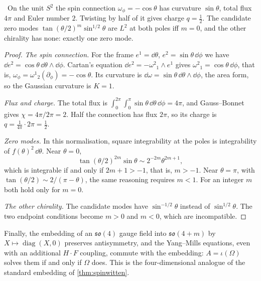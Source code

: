 \begin{proposition}\label{prop:twist}\ver\
On the unit $S^2$ the spin connection $\omega_\phi=-\cos\theta$ has curvature $\sin\theta$, total flux $4\pi$ and Euler number $2$. Twisting by half of it gives charge $q=\frac12$. The candidate zero modes $\tan(\theta/2)^m\sin^{1/2}\theta$ are $L^2$ at both poles iff $m=0$, and the other chirality has none: exactly one zero mode.
\end{proposition}
\begin{proof}
\emph{The spin connection.} For the frame $e^1=\dd\theta$, $e^2=\sin\theta\,\dd\phi$ we have $\dd e^2=\cos\theta\,\dd\theta\wedge\dd\phi$. Cartan's equation $\dd e^2=-\omega^2{}_1\wedge e^1$ gives $\omega^2{}_1=\cos\theta\,\dd\phi$, that is, $\omega_\phi=\omega^1{}_2(\partial_\phi)=-\cos\theta$. Its curvature is $\dd\omega=\sin\theta\,\dd\theta\wedge\dd\phi$, the area form, so the Gaussian curvature is $K=1$.

\emph{Flux and charge.} The total flux is $\int_0^{2\pi}\!\int_0^\pi\sin\theta\,\dd\theta\,\dd\phi=4\pi$, and Gauss--Bonnet gives $\chi=4\pi/2\pi=2$. Half the connection has flux $2\pi$, so its charge is $q=\frac1{4\pi}\cdot2\pi=\frac12$.

\emph{Zero modes.} In this normalisation, square integrability at the poles is integrability of $f(\theta)^2\,\dd\theta$. Near $\theta=0$,
\[
\tan(\theta/2)^{2m}\sin\theta\sim2^{-2m}\theta^{2m+1},
\]
which is integrable if and only if $2m+1>-1$, that is, $m>-1$. Near $\theta=\pi$, with $\tan(\theta/2)\sim2/(\pi-\theta)$, the same reasoning requires $m<1$. For an integer $m$ both hold only for $m=0$.

\emph{The other chirality.} The candidate modes have $\sin^{-1/2}\theta$ instead of $\sin^{1/2}\theta$. The two endpoint conditions become $m>0$ and $m<0$, which are incompatible.
\end{proof}


Finally, the embedding of an $\mathfrak{so}(4)$ gauge field into $\mathfrak{so}(4+m)$ by $X\mapsto\operatorname{diag}(X,0)$ preserves antisymmetry, and the Yang--Mills equations, even with an additional $H\cdot F$ coupling, commute with the embedding: $A=\iota(\Omega)$ solves them if and only if $\Omega$ does. This is the four-dimensional analogue of the standard embedding of \cref{thm:spinwitten}.

